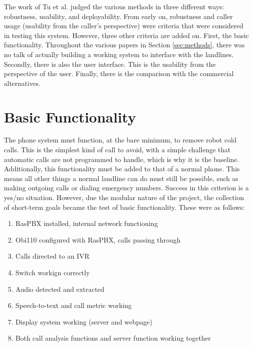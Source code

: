 \documentclass[main.tex]{subfiles}
\begin{document}
The work of Tu et al. \cite{cisco} judged the various methods in three different ways: robustness, usability, and deployability. From early on, robustness and caller usage (usability from the caller's perspective) were criteria that were considered in testing this system. However, three other criteria are added on. First, the basic functionality. Throughout the various papers in Section \ref{sec:methods}, there was no talk of actually building a working system to interface with the landlines. Secondly, there is also the user interface. This is the usability from the perspective of the user. Finally, there is the comparison with the commercial alternatives.

\section{Basic Functionality}
The phone system must function, at the bare minimum, to remove robot cold calls. This is the simplest kind of call to avoid, with a simple challenge that automatic calls are not programmed to handle, which is why it is the baseline. Additionally, this functionality must be added to that of a normal phone. This means all other things a normal landline can do must still be possible, such as making outgoing calls or dialing emergency numbers. Success in this criterion is a yes/no situation. However, due the modular nature of the project, the collection of short-term goals became the test of basic functionality. These were as follows:

\begin{enumerate}
	\item RasPBX installed, internal network functioning
	\item Obi110 configured with RasPBX, calls passing through
	\item Calls directed to an IVR
	\item Switch workign correctly
	\item Audio detected and extracted
	\item Speech-to-text and call metric working
	\item Display system working (server and webpage)
	\item Both call analysis functions and server function working together
\end{enumerate}
\end{document}
